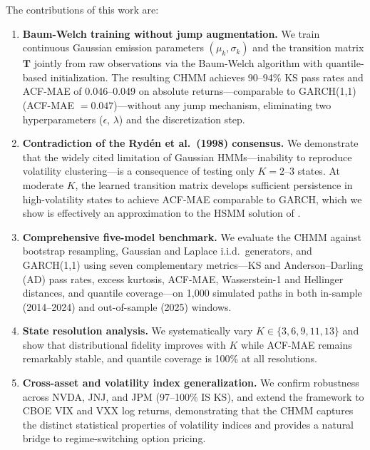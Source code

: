 The contributions of this work are:
\begin{enumerate}
    \item \textbf{Baum-Welch training without jump augmentation.}
    We train continuous Gaussian emission parameters $(\mu_k, \sigma_k)$ and the transition matrix $\mathbf{T}$ jointly from raw observations via the Baum-Welch algorithm with quantile-based initialization.
    The resulting CHMM achieves 90--94\% KS pass rates and ACF-MAE of 0.046--0.049 on absolute returns---comparable to GARCH(1,1) (ACF-MAE $= 0.047$)---without any jump mechanism, eliminating two hyperparameters ($\epsilon$, $\lambda$) and the discretization step.

    \item \textbf{Contradiction of the Ryd\'{e}n et al.\ (1998) consensus.}
    We demonstrate that the widely cited limitation of Gaussian HMMs---inability to reproduce volatility clustering---is a consequence of testing only $K = 2$--$3$ states.
    At moderate $K$, the learned transition matrix develops sufficient persistence in high-volatility states to achieve ACF-MAE comparable to GARCH, which we show is effectively an approximation to the HSMM solution of \citet{bulla2006stylized}.

    \item \textbf{Comprehensive five-model benchmark.}
    We evaluate the CHMM against bootstrap resampling, Gaussian and Laplace i.i.d.\ generators, and GARCH(1,1) using seven complementary metrics---KS and Anderson--Darling (AD) pass rates, excess kurtosis, ACF-MAE, Wasserstein-1 and Hellinger distances, and quantile coverage---on 1,000 simulated paths in both in-sample (2014--2024) and out-of-sample (2025) windows.

    \item \textbf{State resolution analysis.}
    We systematically vary $K \in \{3, 6, 9, 11, 13\}$ and show that distributional fidelity improves with $K$ while ACF-MAE remains remarkably stable, and quantile coverage is 100\% at all resolutions.

    \item \textbf{Cross-asset and volatility index generalization.}
    We confirm robustness across NVDA, JNJ, and JPM (97--100\% IS KS), and extend the framework to CBOE VIX and VXX log returns, demonstrating that the CHMM captures the distinct statistical properties of volatility indices and provides a natural bridge to regime-switching option pricing.
\end{enumerate}

